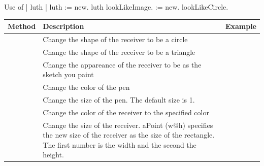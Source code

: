\begin{scriptwithtitle}{Use of }\label{scr:lookimage}
| \caro luth | 
luth := \Turtle new.
luth  lookLikeImage.
\caro := \Turtle new.
\caro lookLikeCircle.
\end{scriptwithtitle}

\summa

\begin{table}[h]
\centering
\begin{tabular}{||p{3cm}|p{4cm}|p{6.5cm}||} \hline
Method&Description&Example\\[1ex] \hline
\ct{lookLikeCircle}&Change the shape of the receiver to be a circle& \ct{\Turtle new lookLikeCircle}\\ \hline
\ct{lookLikeTriangle}&Change the shape of the receiver to be a triangle&\ct{\Turtle new lookLikeTriangle}\\ \hline
\ct{lookLikeImage}&Change the appareance of the receiver to be as the sketch you paint& \ct{\Turtle new lookLikeImage} \\ \hline

\ct{penColor: aColor}&Change the color of the pen& \ct{\Turtle new penColor: Color blue}\\ \hline
\ct{penSize: aNumber}&Change the size of the pen. The default size is 1.&\ct{\Turtle new penSize: 3}\\ \hline

\ct{color: aColor}&Change the color of the receiver to the specified color& \ct{\Turtle new color: Color yellow}\\ \hline
\ct{extent: aPoint}&Change the size of the receiver. aPoint (w@h) specifies the new size of the receiver as the size of the rectangle. The first number is the width and the second the height. &\ct{\Turtle new extent: 80@100}\\ \hline

\end{tabular}
\end{table}

\ifx\wholebook\relax\else\fi



